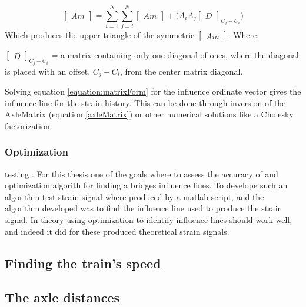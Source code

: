 \begin{equation}
\begin{bmatrix} Am \end{bmatrix} = \sum_{i = 1}^{N} \sum_{j = i}^{N} \begin{bmatrix} Am \end{bmatrix} + \big( A_i A_j  \begin{bmatrix} D \end{bmatrix}_{C_j - C_i}\big)
\label{axleMatrix}
\end{equation}
Which produces the upper triangle of the symmetric $ \begin{bmatrix} Am \end{bmatrix} $.
Where:
\begin{description}
\item $\begin{bmatrix} D \end{bmatrix}_{C_j - C_i}$ = a matrix containing only one diagonal of ones, where the diagonal is placed with an offset, $C_j - C_i$, from the center matrix diagonal.
\end{description}
Solving equation \ref{equation:matrixForm} for the influence ordinate vector gives the influence line for the strain history. This can be done through inversion of the AxleMatrix (equation \ref{axleMatrix}) or other numerical solutions like a Cholesky factorization.
\subsubsection{Optimization}
testing \cite{Liljencrantz}.
For this thesis one of the goals where to assess the accuracy of and optimization algorith for finding a bridges influence lines. To develope such an algorithm test strain signal where produced by a matlab script, and the algorithm developed was to find the influence line used to produce the strain signal.
In theory using optimization to identify influence lines should work well, and indeed it did for these produced theoretical strain signals.

\subsection{Finding the train's speed}

\subsection{The axle distances}

